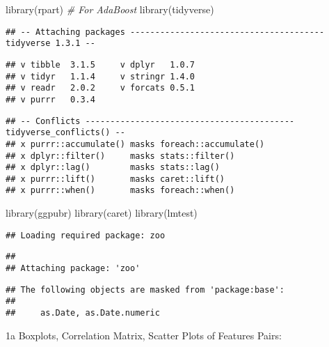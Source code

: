 \documentclass[
]{article}
\newenvironment{Shaded}{\begin{snugshade}}{\end{snugshade}}
\newcommand{\AttributeTok}[1]{\textcolor[rgb]{0.77,0.63,0.00}{#1}}
\newcommand{\CommentTok}[1]{\textcolor[rgb]{0.56,0.35,0.01}{\textit{#1}}}
\newcommand{\FunctionTok}[1]{\textcolor[rgb]{0.00,0.00,0.00}{#1}}
\newcommand{\NormalTok}[1]{#1}
\newcommand{\OtherTok}[1]{\textcolor[rgb]{0.56,0.35,0.01}{#1}}
\newcommand{\SpecialCharTok}[1]{\textcolor[rgb]{0.00,0.00,0.00}{#1}}
\newcommand{\StringTok}[1]{\textcolor[rgb]{0.31,0.60,0.02}{#1}}
\begin{document}
\begin{Shaded}
\begin{Highlighting}[]
\FunctionTok{library}\NormalTok{(rpart) }\CommentTok{\# For AdaBoost}
\FunctionTok{library}\NormalTok{(tidyverse)}
\end{Highlighting}
\end{Shaded}

\begin{verbatim}
## -- Attaching packages --------------------------------------- tidyverse 1.3.1 --
\end{verbatim}

\begin{verbatim}
## v tibble  3.1.5     v dplyr   1.0.7
## v tidyr   1.1.4     v stringr 1.4.0
## v readr   2.0.2     v forcats 0.5.1
## v purrr   0.3.4
\end{verbatim}

\begin{verbatim}
## -- Conflicts ------------------------------------------ tidyverse_conflicts() --
## x purrr::accumulate() masks foreach::accumulate()
## x dplyr::filter()     masks stats::filter()
## x dplyr::lag()        masks stats::lag()
## x purrr::lift()       masks caret::lift()
## x purrr::when()       masks foreach::when()
\end{verbatim}

\begin{Shaded}
\begin{Highlighting}[]
\FunctionTok{library}\NormalTok{(ggpubr)}
\FunctionTok{library}\NormalTok{(caret)}
\FunctionTok{library}\NormalTok{(lmtest)}
\end{Highlighting}
\end{Shaded}

\begin{verbatim}
## Loading required package: zoo
\end{verbatim}

\begin{verbatim}
## 
## Attaching package: 'zoo'
\end{verbatim}

\begin{verbatim}
## The following objects are masked from 'package:base':
## 
##     as.Date, as.Date.numeric
\end{verbatim}

1a Boxplots, Correlation Matrix, Scatter Plots of Features Pairs:

\begin{Shaded}
\end{Shaded}
\end{document}
